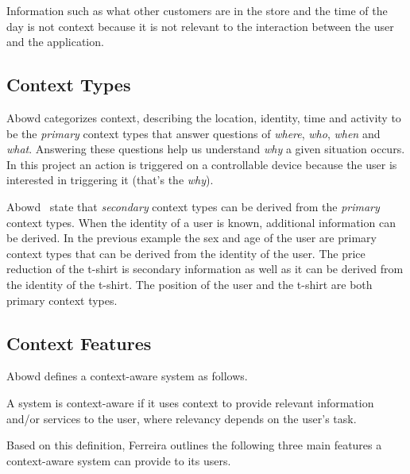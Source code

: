 Information such as what other customers are in the store and the time of the day is not context because it is not relevant to the interaction between the user and the application.

\subsection{Context Types}

Abowd \etal\cite{abowd1999towards} categorizes context, describing the location, identity, time and activity to be the \emph{primary} context types that answer questions of \emph{where}, \emph{who}, \emph{when} and \emph{what}. Answering these questions help us understand \emph{why} a given situation occurs. In this project an action is triggered on a controllable device because the user is interested in triggering it (that's the \emph{why}).

Abowd \etal~state that \emph{secondary} context types can be derived from the \emph{primary} context types. When the identity of a user is known, additional information can be derived. In the previous example the sex and age of the user are primary context types that can be derived from the identity of the user. 
The price reduction of the t-shirt is secondary information as well as it can be derived from the identity of the t-shirt.
The position of the user and the t-shirt are both primary context types.

\subsection{Context Features}

Abowd \etal\cite{abowd1999towards} defines a context-aware system as follows.

\begin{italicquote}
A system is context-aware if it uses context to provide relevant information and/or services to the user, where relevancy depends on the user's task.
\end{italicquote}

Based on this definition, Ferreira \etal\cite{ferreira2014distributed} outlines the following three main features a context-aware system can provide to its users.

